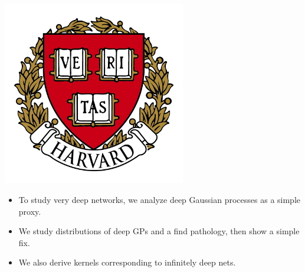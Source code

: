 \documentclass[landscape,a0b,final,a4resizeable]{include/a0poster}
\begin{document}
\begin{poster}
\begin{center}
\begin{pcolumn}{0.99}
{\begin{minipage}[c][9cm][c]{0.76\textwidth}
\end{minipage}
%
%
\begin{minipage}[c]{\logowidth}
  \begin{flushright}
    \includegraphics[width=8cm,trim=2em 0em 2em 2em, clip]{badges/harvard}
  \end{flushright}
\end{minipage}
%
}
\end{pcolumn}
\end{center}

\vspace*{2.5cm}

\large




\begin{multicols}{3}





\begin{itemize}
	\item To study very deep networks, we analyze deep Gaussian processes as a simple proxy.
	\item We study distributions of deep GPs and a find pathology, then show a simple fix.
	\item We also derive kernels corresponding to infinitely deep nets.
\end{itemize}

\vspace{0.5in}


\end{multicols}
\end{poster}
\end{document}

